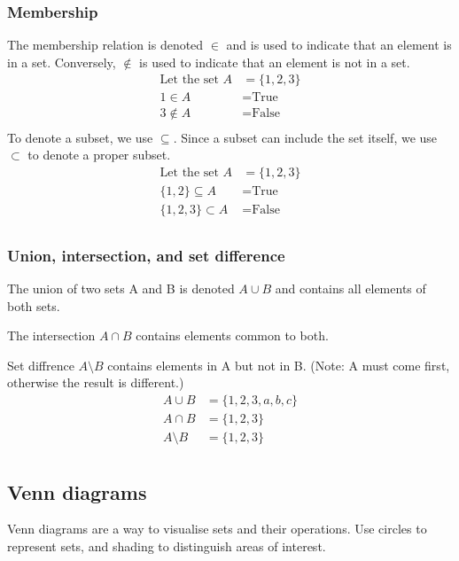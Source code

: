 \documentclass{article}
\begin{document}
\subsubsection{Membership}
The membership relation is denoted $\in$ and is used to indicate that an element is in a set.
Conversely, $\notin$ is used to indicate that an element is not in a set.
\begin{align*}
    \text{Let the set } A & = \{1, 2, 3\}  \\
    1 \in A               & = \text{True}  \\
    3 \notin A            & = \text{False} \\
\end{align*}
To denote a subset, we use $\subseteq$.
Since a subset can include the set itself, we use $\subset$ to denote a proper subset.
\begin{align*}
    \text{Let the set } A & = \{1, 2, 3\}  \\
    \{1, 2\} \subseteq A  & = \text{True}  \\
    \{1, 2, 3\} \subset A & = \text{False} \\
\end{align*}

\subsubsection{Union, intersection, and set difference}

The union of two sets A and B is denoted $A \cup B$ and contains all elements of both sets.

The intersection $A \cap B$ contains elements common to both.

Set diffrence $A \setminus B$ contains elements in A but not in B. (Note: A must come first, otherwise the result is different.)
\begin{align*}
    A \cup B      & = \{1, 2, 3, a, b, c\} \\
    A \cap B      & = \{1, 2, 3\}          \\
    A \setminus B & = \{1, 2, 3\}          \\
\end{align*}

\subsection{Venn diagrams}
Venn diagrams are a way to visualise sets and their operations.
Use circles to represent sets, and shading to distinguish areas of interest.
\end{document}
